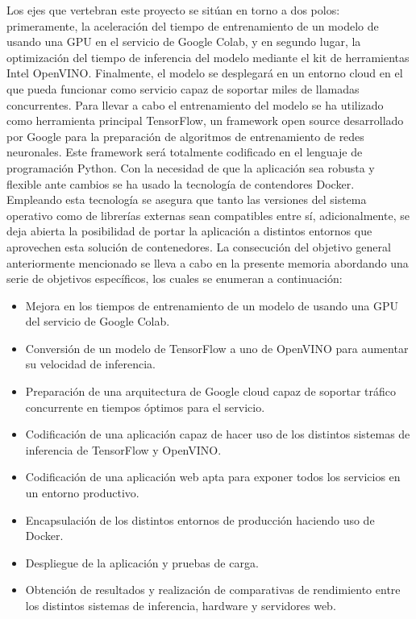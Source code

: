 Los ejes que vertebran este proyecto se sitúan en torno a dos polos: primeramente, la aceleración del tiempo de entrenamiento de un modelo de  usando una GPU en el servicio de Google Colab, y en segundo lugar, la optimización del tiempo de inferencia del modelo mediante el kit de herramientas Intel OpenVINO. Finalmente, el modelo se desplegará en un entorno cloud en el que pueda funcionar como servicio capaz de soportar miles de llamadas concurrentes.
Para llevar a cabo el entrenamiento del modelo se ha utilizado como herramienta principal TensorFlow, un framework open source desarrollado por Google para la preparación de algoritmos de entrenamiento de redes neuronales.
Este framework será totalmente codificado en el lenguaje de programación Python.
Con la necesidad de que la aplicación sea robusta y flexible ante cambios se ha usado la tecnología de contendores Docker.
Empleando esta tecnología se asegura que tanto las versiones del sistema operativo como de librerías externas sean compatibles entre sí, adicionalmente, se deja abierta la posibilidad de portar la aplicación a distintos entornos que aprovechen esta solución de contenedores.
La consecución del objetivo general anteriormente mencionado se lleva a cabo en la presente memoria abordando una serie de objetivos específicos, los cuales se enumeran a
continuación:
\begin{itemize}
    \item Mejora en los tiempos de entrenamiento de un modelo de  usando una GPU del servicio de Google Colab.
    \item Conversión de un modelo de TensorFlow a uno de OpenVINO para aumentar su velocidad de inferencia.
    \item Preparación de una arquitectura de Google cloud capaz de soportar tráfico concurrente en tiempos óptimos para el servicio.
    \item Codificación de una aplicación capaz de hacer uso de los distintos sistemas de inferencia de TensorFlow y OpenVINO\@.
    \item Codificación de una aplicación web apta para exponer todos los servicios en un entorno productivo.
    \item Encapsulación de los distintos entornos de producción haciendo uso de Docker.
    \item Despliegue de la aplicación y pruebas de carga.
    \item Obtención de resultados y realización de comparativas de rendimiento entre los distintos sistemas de inferencia, hardware y servidores web.
\end{itemize}


